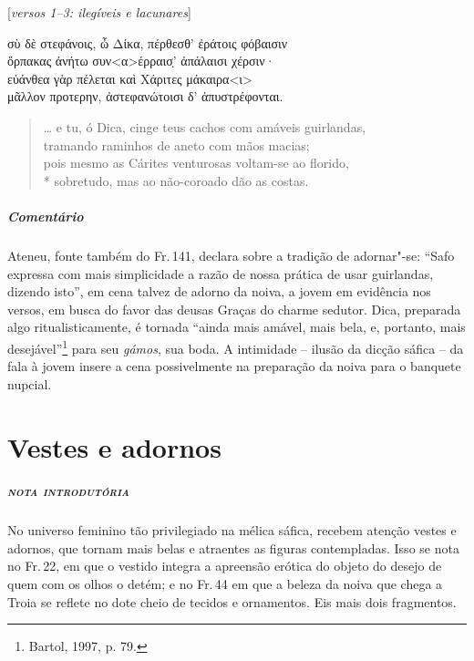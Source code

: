 {\begin{gkverse}
\textnormal{[\textit{versos 1--3: ilegíveis e lacunares}]}

σὺ δὲ στεφάνοις, ὦ Δίκα, πέρθεσθ’ ἐράτοις φόβαισιν\\
ὄρπακας ἀνήτω συν<α>έρραισ̣’ ἀπάλαισι χέρσιν·\\
εὐάνθεα \dagger{}γὰρ πέλεται\dagger{} καὶ Χάριτες μάκαιρα<ι>\\
μᾶλλον \dagger{}προτερην\dagger{}, ἀστεφανώτοισι δ’ ἀπυστρέφονται.
\end{gkverse}

\begin{verse}
\ldots{} e tu, ó Dica, cinge teus cachos com amáveis guirlandas,\\
tramando raminhos de aneto com mãos macias;\\
pois mesmo as Cárites venturosas voltam-se ao florido,\\*
sobretudo, mas ao não-coroado dão as costas.
\end{verse}

\medskip

{\paragraph{Comentário} Ateneu, fonte também do Fr.\,141, declara sobre a tradição de adornar"-se:
``Safo expressa com mais simplicidade a razão de nossa prática
de usar guirlandas, dizendo isto'', em cena talvez de adorno da noiva, a jovem em evidência nos versos, em busca do favor das deusas Graças do charme sedutor.
Dica, preparada algo ritualisticamente, é tornada ``ainda mais amável, mais bela, e, portanto, mais desejável''\footnote{Bartol, 1997, p. 79.} para seu \textit{gámos}, sua boda. A intimidade -- ilusão da dicção sáfica -- da fala à jovem insere a cena possivelmente na preparação da noiva para o banquete nupcial.}


\chapter{Vestes e adornos}

\paragraph{\textsc{nota introdutória}}
No universo feminino tão privilegiado na mélica sáfica, recebem atenção vestes e
adornos, que tornam mais belas e atraentes as figuras contempladas. Isso se
nota no Fr.\,22, em que o vestido integra a apreensão erótica do objeto do
desejo de quem com os olhos o detém; e no Fr.\,44 em que a beleza da noiva que chega a
Troia se reflete no dote cheio de tecidos e ornamentos. Eis mais dois fragmentos.


}
